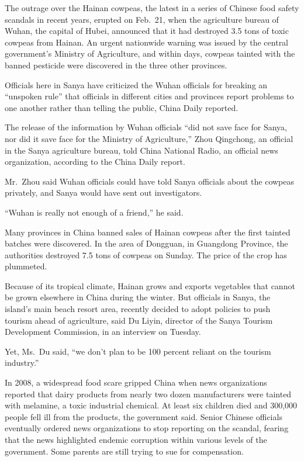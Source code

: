 ﻿\documentclass[12pt]{article}
\begin{document}
The outrage over the Hainan cowpeas, the latest in a series of Chinese food safety scandals in
recent years, erupted on Feb.~21, when the agriculture bureau of Wuhan, the capital of Hubei,
announced that it had destroyed 3.5 tons of toxic cowpeas from Hainan. An urgent nationwide warning
was issued by the central government's Ministry of Agriculture, and within days, cowpeas tainted
with the banned pesticide were discovered in the three other provinces.

Officials here in Sanya have criticized the Wuhan officials for breaking an ``unspoken rule'' that
officials in different cities and provinces report problems to one another rather than telling the
public, China Daily reported.

The release of the information by Wuhan officials ``did not save face for Sanya, nor did it save
face for the Ministry of Agriculture,'' Zhou Qingchong, an official in the Sanya agriculture bureau,
told China National Radio, an official news organization, according to the China Daily report.

Mr.~Zhou said Wuhan officials could have told Sanya officials about the cowpeas privately, and Sanya
would have sent out investigators.

``Wuhan is really not enough of a friend,'' he said.

Many provinces in China banned sales of Hainan cowpeas after the first tainted batches were
discovered. In the area of Dongguan, in Guangdong Province, the authorities destroyed 7.5 tons of
cowpeas on Sunday. The price of the crop has plummeted.

Because of its tropical climate, Hainan grows and exports vegetables that cannot be grown elsewhere
in China during the winter. But officials in Sanya, the island's main beach resort area, recently
decided to adopt policies to push tourism ahead of agriculture, said Du Liyin, director of the Sanya
Tourism Development Commission, in an interview on Tuesday.

Yet, Ms.~Du said, ``we don't plan to be 100 percent reliant on the tourism industry.''

In 2008, a widespread food scare gripped China when news organizations reported that dairy products
from nearly two dozen manufacturers were tainted with melamine, a toxic industrial chemical. At
least six children died and 300,000 people fell ill from the products, the government said. Senior
Chinese officials eventually ordered news organizations to stop reporting on the scandal, fearing
that the news highlighted endemic corruption within various levels of the government. Some parents
are still trying to sue for compensation.
\end{document}
